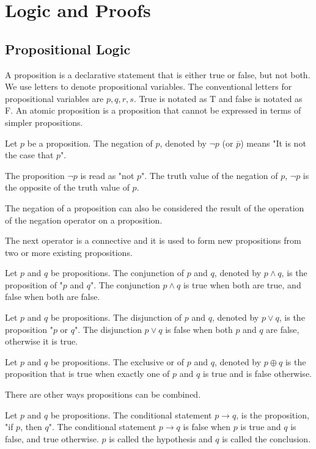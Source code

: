 \documentclass[../discrete.tex]{subfiles}
\begin{document}
\chapter{Logic and Proofs}
\section{Propositional Logic}
A proposition is a declarative statement that is either true or false, but not both. We use letters to denote propositional variables. 
The conventional letters for propositional variables are $p,q,r,s$. True is notated as T and false is notated as F. An atomic proposition 
is a proposition that cannot be expressed in terms of simpler propositions.
\begin{definition}
    Let $p$ be a proposition. The negation of $p$, denoted by $\neg{p}$ (or $\bar{p}$) means "It is not the case that $p$".

    The proposition $\neg{p}$ is read as "not $p$". The truth value of the negation of $p$, $\neg{p}$ 
    is the opposite of the truth value of $p$.
\end{definition}

The negation of a proposition can also be considered the result of the operation of the negation operator on a proposition. 

The next operator is a connective and it is used to form new propositions from two or more existing propositions.
\begin{definition}
    Let $p$ and $q$ be propositions. The conjunction of $p$ and $q$, denoted by $p\land q$, 
    is the proposition of "$p$ and $q$". The conjunction $p\land q$ is true when both are true, and false when both are false.
\end{definition}

\begin{definition}
    Let $p$ and $q$ be propositions. The disjunction of $p$ and $q$, denoted by $p\lor q$, 
    is the proposition "$p$ or $q$". The disjunction $p\lor q$ is false when both $p$ and $q$ are false, otherwise it is true.
\end{definition}

\begin{definition}
    Let $p$ and $q$ be propositions. The exclusive or of $p$ and $q$, denoted by $p\oplus{q}$ 
    is the proposition that is true when exactly one of $p$ and $q$ is true and is false otherwise.
\end{definition}

There are other ways propositions can be combined.
\begin{definition}
    Let $p$ and $q$ be propositions. The conditional statement $p\rightarrow q$, is 
    the proposition, "if $p$, then $q$". The conditional statement $p\rightarrow q$ is 
    false when $p$ is true and $q$ is false, and true otherwise. $p$ is called the 
    hypothesis and $q$ is called the conclusion.
\end{definition}
\end{document}
